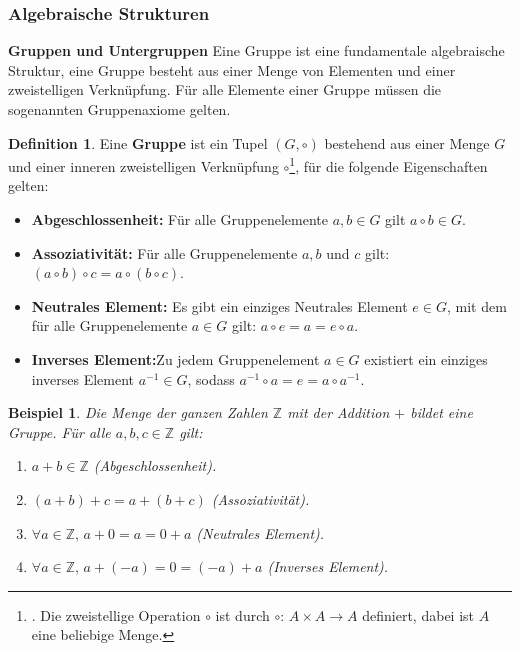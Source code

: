 \documentclass[12pt,oneside]{article}
\newtheorem{example}[theorem]{Beispiel}
\theoremstyle{remark}
\theoremstyle{definition}
\newtheorem{definition}{Definition}[section]
\begin{document}
\subsubsection{Algebraische Strukturen}

\textbf{Gruppen und Untergruppen}\newline
Eine Gruppe ist eine fundamentale algebraische Struktur, eine Gruppe besteht aus einer Menge von Elementen und einer zweistelligen Verknüpfung. Für alle Elemente einer Gruppe müssen die sogenannten Gruppenaxiome gelten.   
\begin{definition}
Eine \textbf{Gruppe} ist ein Tupel $(G, \circ)$ bestehend aus einer Menge $G$ und einer inneren zweistelligen Verknüpfung $\circ$\footnote{. Die zweistellige Operation $\circ$ ist durch $\circ: \, A \times A \to A$ definiert, dabei ist $A$ eine beliebige Menge.}, für die folgende Eigenschaften gelten:
\begin{itemize}
    \item \textbf{Abgeschlossenheit:} Für alle Gruppenelemente $a,b \in G$ gilt $a \circ b \in G$.\newline
    
    \item \textbf{Assoziativität:} Für alle Gruppenelemente $a,b$ und $c$ gilt:\newline
    $(a \circ b) \circ c = a \circ (b \circ c)$.\newline
    \item \textbf{Neutrales Element:} Es gibt ein einziges Neutrales Element $e \in G$, mit dem für alle Gruppenelemente $a \in G$ gilt:\newline
    $a \circ e = a = e \circ a$.\newline
    \item \textbf{Inverses Element:}Zu jedem Gruppenelement $a \in G$ existiert ein einziges inverses Element $a^{-1} \in G$, sodass 
    $a^{-1} \circ a  = e = a \circ a^{-1}$.\newline
\end{itemize}
\end{definition}

\smallskip

\begin{example}
Die Menge der ganzen Zahlen $\mathbb{Z}$ mit der Addition $+$ bildet eine Gruppe.
Für alle $a,b,c \in \mathbb{Z}$ gilt:
\begin{enumerate}
    \item $a + b \in \mathbb{Z}$ (Abgeschlossenheit).\newline
    
    \item $(a + b) + c = a + (b + c)$ (Assoziativität).\newline
    
    \item $\forall a \in \mathbb{Z}, \, a + 0 = a = 0 + a$ (Neutrales Element).\newline
    
    \item $\forall a \in \mathbb{Z}, \, a + (-a) = 0 = (-a) + a$ (Inverses Element).
\end{enumerate}
\end{example}
\end{document}
